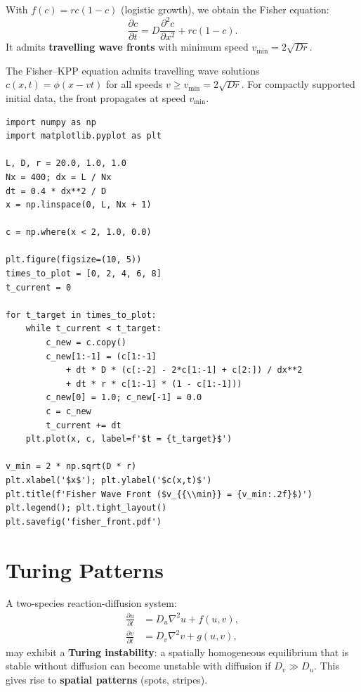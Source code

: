 \begin{example}
With $f(c)=rc(1-c)$ (logistic growth), we obtain the Fisher equation:
\[
  \frac{\partial c}{\partial t} = D\frac{\partial^2 c}{\partial x^2}
  + rc(1-c).
\]
It admits \textbf{travelling wave fronts} with minimum speed
$v_{\min}=2\sqrt{Dr}$.
\end{example}

\begin{theorem}
The Fisher--KPP equation admits travelling wave solutions
$c(x,t)=\phi(x-vt)$ for all speeds $v\geq v_{\min}=2\sqrt{Dr}$.
For compactly supported initial data, the front propagates at speed
$v_{\min}$.
\end{theorem}

\begin{codeblock}[title=\textbf{Fisher wave front}]
\begin{verbatim}
import numpy as np
import matplotlib.pyplot as plt

L, D, r = 20.0, 1.0, 1.0
Nx = 400; dx = L / Nx
dt = 0.4 * dx**2 / D
x = np.linspace(0, L, Nx + 1)

c = np.where(x < 2, 1.0, 0.0)

plt.figure(figsize=(10, 5))
times_to_plot = [0, 2, 4, 6, 8]
t_current = 0

for t_target in times_to_plot:
    while t_current < t_target:
        c_new = c.copy()
        c_new[1:-1] = (c[1:-1]
            + dt * D * (c[:-2] - 2*c[1:-1] + c[2:]) / dx**2
            + dt * r * c[1:-1] * (1 - c[1:-1]))
        c_new[0] = 1.0; c_new[-1] = 0.0
        c = c_new
        t_current += dt
    plt.plot(x, c, label=f'$t = {t_target}$')

v_min = 2 * np.sqrt(D * r)
plt.xlabel('$x$'); plt.ylabel('$c(x,t)$')
plt.title(f'Fisher Wave Front ($v_{{\\min}} = {v_min:.2f}$)')
plt.legend(); plt.tight_layout()
plt.savefig('fisher_front.pdf')
\end{verbatim}
\end{codeblock}

\section{Turing Patterns}

\begin{definition}
A two-species reaction-diffusion system:
\begin{align}
  \frac{\partial u}{\partial t} &= D_u\nabla^2 u + f(u,v), \\
  \frac{\partial v}{\partial t} &= D_v\nabla^2 v + g(u,v),
\end{align}
may exhibit a \textbf{Turing instability}: a spatially homogeneous
equilibrium that is stable without diffusion can become unstable with
diffusion if $D_v \gg D_u$.  This gives rise to \textbf{spatial
patterns} (spots, stripes).
\end{definition}

